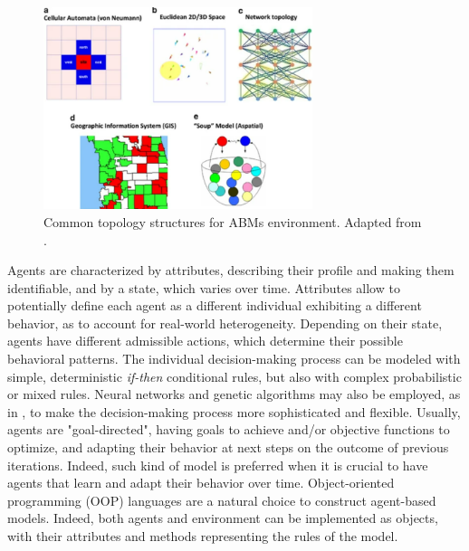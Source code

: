 \begin{figure}
    \centering
    \includegraphics[width=0.7\textwidth]{tex/pics/abm_topologies.png}
    \caption{Common topology structures for ABMs environment. Adapted from \textcite{tutorialABM1}.}
    \label{topologies}
\end{figure}

Agents are characterized by attributes, describing their profile and making them identifiable, and by a state, which varies over time. Attributes allow to potentially define each agent as a different individual exhibiting a different behavior, as to account for real-world heterogeneity. Depending on their state, agents have different admissible actions, which determine their possible behavioral patterns. The individual decision-making process can be modeled with simple, deterministic \textit{if-then} conditional rules, but also with complex probabilistic or mixed rules. Neural networks and genetic algorithms may also be employed, as in \textcite{ALKINANI20228325, abm_rl}, to make the decision-making process more sophisticated and flexible. Usually, agents are "goal-directed", having goals to achieve and/or objective functions to optimize, and adapting their behavior at next steps on the outcome of previous iterations. Indeed, such kind of model is preferred when it is crucial to have agents that learn and adapt their behavior over time.
Object-oriented programming (OOP) languages are a natural choice to construct agent-based models. Indeed, both agents and environment can be implemented as objects, with their attributes and methods representing the rules of the model. \\
  
